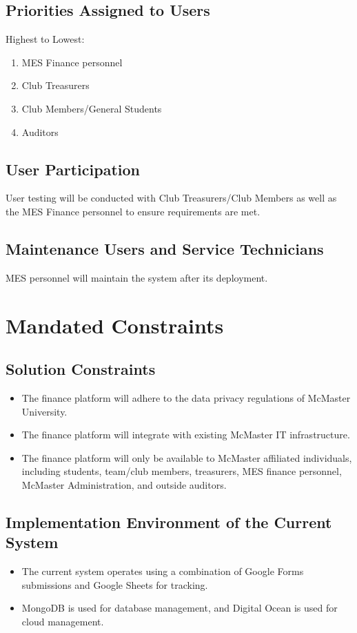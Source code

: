 \documentclass[12pt]{article}
\begin{document}
\subsection{Priorities Assigned to Users}
Highest to Lowest:
\begin{enumerate}
    \item MES Finance personnel
    \item Club Treasurers
    \item Club Members/General Students
    \item Auditors
\end{enumerate}

\subsection{User Participation}
User testing will be conducted with Club Treasurers/Club Members as well as the MES Finance personnel to ensure requirements are met.

\subsection{Maintenance Users and Service Technicians}
MES personnel will maintain the system after its deployment.


\section{Mandated Constraints}
\subsection{Solution Constraints}
\begin{itemize}
    \item The finance platform will adhere to the data privacy regulations of McMaster University.
    \item The finance platform will integrate with existing McMaster IT infrastructure.
    \item The finance platform will only be available to McMaster affiliated individuals, including students, team/club members, treasurers, MES finance personnel, McMaster Administration, and outside auditors.
\end{itemize}

\subsection{Implementation Environment of the Current System}
\begin{itemize}
    \item The current system operates using a combination of Google Forms submissions and Google Sheets for tracking. 
    \item MongoDB is used for database management, and Digital Ocean is used for cloud management.
\end{itemize}
\end{document}
